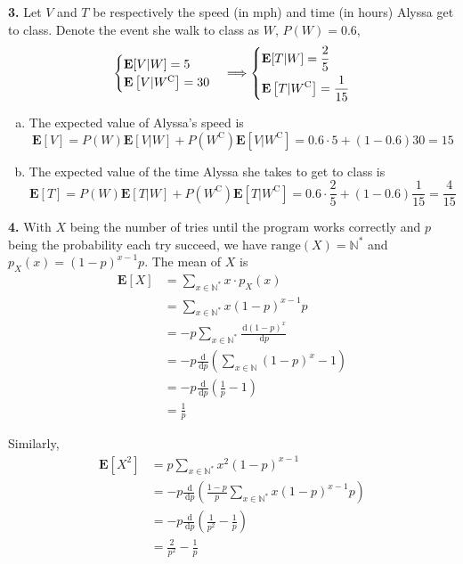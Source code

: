 \documentclass[a4paper,12pt]{article}
\newcommand{\E}{\mathbf E}
\newcommand{\C}{\mathrm C}
\newcommand{\ud}{\,\mathrm{d}}
\newcommand{\exercise}[1]{\noindent\textbf{#1.}}
\begin{document}
\exercise 3  Let $V$ and $T$ be respectively the speed (in mph) and time
(in hours) Alyssa get to class.  Denote the event she walk to class as $W$,
$P(W) = 0.6$,
\[\begin{cases}
  \E[V|W] = 5\\
  \E\left[V|W^\C\right] = 30
\end{cases}
\Longrightarrow\begin{dcases}
  \E[T|W] = \frac{2}{5}\\
\E\left[T|W^\C\right] = \frac{1}{15}
\end{dcases}\]
\begin{enumerate}[(a)]
  \item The expected value of Alyssa's speed is
    \[\E[V] = P(W)\E[V|W] + P\left(W^\C\right)\E\left[V|W^\C\right]
    = 0.6\cdot 5 + (1 - 0.6)30 = 15\]
  \item The expected value of the time Alyssa she takes to get to class is
    \[\E[T] = P(W)\E[T|W] + P\left(W^\C\right)\E\left[T|W^\C\right]
    = 0.6\cdot\frac{2}{5} + (1 - 0.6)\frac{1}{15} = \frac{4}{15}\]
\end{enumerate}

\exercise 4  With $X$ being the number of tries until the program works
correctly and $p$ being the probability each try succeed,
we have $\mathrm{range}(X) = \mathbb N^*$ and $p_X(x) = (1 - p)^{x - 1}p$.
The mean of $X$ is
\begin{align*}
  \E[X] &= \sum_{x\in\mathbb N^*}x\cdot p_X(x)\\
  &= \sum_{x\in\mathbb N^*}x(1 - p)^{x - 1}p\\
  &= -p\sum_{x\in\mathbb N^*}\frac{\ud (1 - p)^x}{\ud p}\\
  &= -p\frac{\ud}{\ud p}\left(\sum_{x\in\mathbb N}(1 - p)^{x} - 1\right)\\
  &= -p\frac{\ud}{\ud p}\left(\frac{1}{p} - 1\right)\\
  &= \frac{1}{p}
\end{align*}

Similarly,
\begin{align*}
  \E\left[X^2\right] &= p\sum_{x\in\mathbb N^*}x^2(1 - p)^{x - 1}\\
  &= -p\frac{\ud}{\ud p}
  \left(\frac{1 - p}{p}\sum_{x\in\mathbb N^*}x(1 - p)^{x - 1}p\right)\\
  &= -p\frac{\ud}{\ud p}\left(\frac{1}{p^2} - \frac{1}{p}\right)\\
  &= \frac{2}{p^2} - \frac{1}{p}
\end{align*}
\end{document}
